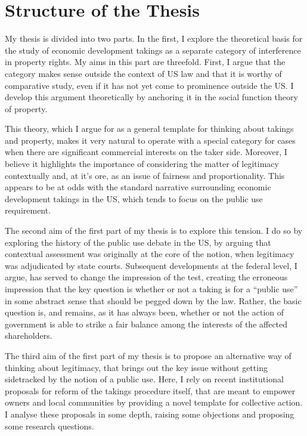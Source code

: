 \section{Structure of the Thesis}

My thesis is divided into two parts. In the first, I explore the theoretical basis for the study of economic development takings as a separate category of interference in property rights. My aims in this part are threefold. First, I argue that the category makes sense outside the context of US law and that it is worthy of comparative study, even if it has not yet come to prominence outside the US. I develop this argument theoretically by anchoring it in the social function theory of property. 

This theory, which I argue for as a general template for thinking about takings and property, makes it very natural to operate with a special category for cases when there are significant commercial interests on the taker side. Moreover, I believe it highlights the importance of considering the matter of legitimacy contextually and, at it's ore, as an issue of fairness and proportionality. This appears to be at odds with the standard narrative surrounding economic development takings in the US, which tends to focus on the public use requirement.

The second aim of the first part of my thesis is to explore this tension. I do so by exploring the history of the public use debate in the US, by arguing that contextual assessment was originally at the core of the notion, when legitimacy was adjudicated by state courts. Subsequent developments at the federal level, I argue, has served to change the impression of the test, creating the erroneous impression that the key question is whether or not a taking is for a ``public use'' in some abstract sense that should be pegged down by the law. Rather, the basic question is, and remains, as it has always been, whether or not the action of government is able to strike a fair balance among the interests of the affected shareholders.

The third aim of the first part of my thesis is to propose an alternative way of thinking about legitimacy, that brings out the key issue without getting sidetracked by the notion of a public use. Here, I rely on recent institutional proposals for reform of the takings procedure itself, that are meant to empower owners and local communities by providing a novel template for collective action. I analyse these proposals in some depth, raising some objections and proposing some research questions.

